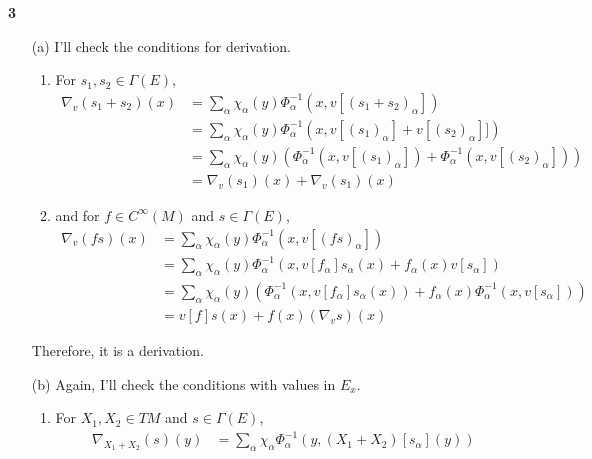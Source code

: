 \documentclass[a4paper, 12pt]{article}
\theoremstyle{Mydefinition}
\theoremstyle{Mytheorem}
\begin{document}
\noindent \textbf{3}
\begin{enumerate}
    \item[(a)] I'll check the conditions for derivation.
    \begin{enumerate}
        \item For $s_1, s_2\in \Gamma(E)$, 
        \begin{equation*}
            \begin{split}
                \nabla_{v}(s_1+s_2)(x) &= \sum_{\alpha}\chi_\alpha(y)\Phi_\alpha^{-1}(x, v[(s_1+s_2)_\alpha]) \\
                &=\sum_{\alpha}\chi_\alpha(y)\Phi_\alpha^{-1}(x, v[(s_1)_\alpha]+v[(s_2)_\alpha]]) \\
                &=\sum_{\alpha}\chi_\alpha(y)\left(\Phi_\alpha^{-1}(x, v[(s_1)_\alpha])+\Phi_\alpha^{-1}(x, v[(s_2)_\alpha])\right) \\
                &=\nabla_{v}(s_1)(x) + \nabla_{v}(s_1)(x)
            \end{split}
        \end{equation*}
        \item and for $f\in C^\infty(M)$ and $s\in\Gamma(E)$,
        \begin{equation*}
            \begin{split}
                \nabla_{v}(fs)(x) &= \sum_{\alpha}\chi_\alpha(y)\Phi_\alpha^{-1}(x, v[(fs)_\alpha]) \\
                &= \sum_{\alpha}\chi_\alpha(y)\Phi_\alpha^{-1}(x, v[f_\alpha]s_\alpha(x) + f_\alpha(x) v[s_\alpha]) \\
                &= \sum_{\alpha}\chi_\alpha(y)\left(\Phi_\alpha^{-1}(x, v[f_\alpha]s_\alpha(x))+f_\alpha(x)\Phi_\alpha^{-1}(x,  v[s_\alpha])\right) \\
                &= v[f]s(x) + f(x)(\nabla_v s)(x)
            \end{split}
        \end{equation*}
    \end{enumerate}
    Therefore, it is a derivation.
    \item[(b)] Again, I'll check the conditions with values in $E_x$.
    \begin{enumerate}
        \item For $X_1,X_2\in TM$ and $s\in \Gamma(E)$,
        \begin{equation*}
            \begin{split}
                \nabla_{X_1+X_2}(s)(y) &= \sum_{\alpha}\chi_\alpha \Phi_{\alpha}^{-1}(y, (X_1+X_2)[s_\alpha](y))\\

\end{split}
\end{equation*}
\end{enumerate}
\end{enumerate}
\end{document}
